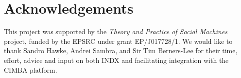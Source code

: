 \documentclass{sig-alternate}
\begin{document}







\section{Acknowledgements}

This project was supported by the \emph{Theory and Practice of Social Machines} project, funded by the EPSRC under grant EP/J017728/1. We would like to thank Sandro Hawke, Andrei Sambra, and Sir Tim Berners-Lee for their time, effort, advice and input on both INDX and facilitating integration with the CIMBA platform.


%
%
\end{document}

